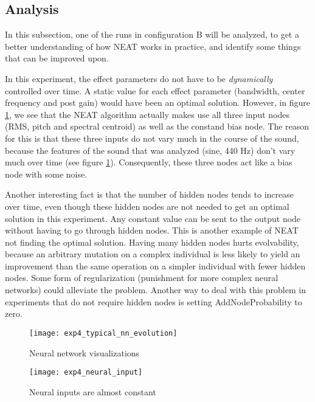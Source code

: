 \subsection{Analysis}

In this subsection, one of the runs in configuration B will be analyzed, to get a better understanding of how NEAT works in practice, and identify some things that can be improved upon.

In this experiment, the effect parameters do not have to be \textit{dynamically} controlled over time. A static value for each effect parameter (bandwidth, center frequency and post gain) would have been an optimal solution. However, in figure \ref{fig:exp4_typical_nn_evolution}, we see that the NEAT algorithm actually makes use all three input nodes (RMS, pitch and spectral centroid) as well as the constand bias node. The reason for this is that these three inputs do not vary much in the course of the sound, because the features of the sound that was analyzed (sine, 440 Hz) don't vary much over time (see figure \ref{fig:exp4_typical_nn_evolution}). Consequently, these three nodes act like a bias node with some noise.

Another interesting fact is that the number of hidden nodes tends to increase over time, even though these hidden nodes are not needed to get an optimal solution in this experiment. Any constant value can be sent to the output node without having to go through hidden nodes. This is another example of NEAT not finding the optimal solution. Having many hidden nodes hurts evolvability, because an arbitrary mutation on a complex individual is less likely to yield an improvement than the same operation on a simpler individual with fewer hidden nodes. Some form of regularization (punishment for more complex neural networks) could alleviate the problem. Another way to deal with this problem in experiments that do not require hidden nodes is setting AddNodeProbability to zero.

\begin{figure}[h]
    \centering
    \texttt{[image: exp4\_typical\_nn\_evolution]}
    \caption{Neural network visualizations}
    \label{fig:exp4_typical_nn_evolution}
\end{figure}

\begin{figure}[h]
    \centering
    \texttt{[image: exp4\_neural\_input]}
    \caption{Neural inputs are almost constant}
    \label{fig:exp4_neural_input}
\end{figure}

